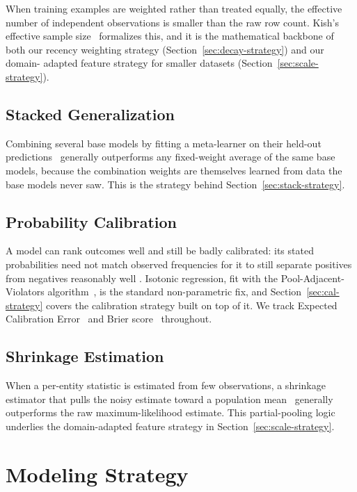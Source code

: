 \documentclass[conference]{IEEEtran}
\begin{document}
When training examples are weighted rather than treated equally, the
effective number of independent observations is smaller than the raw
row count. Kish's effective sample size~\cite{kish1965} formalizes
this, and it is the mathematical backbone of both our recency
weighting strategy (Section~\ref{sec:decay-strategy}) and our domain-
adapted feature strategy for smaller datasets
(Section~\ref{sec:scale-strategy}).

\subsection{Stacked Generalization}

Combining several base models by fitting a meta-learner on their
held-out predictions~\cite{wolpert1992} generally outperforms any
fixed-weight average of the same base models, because the combination
weights are themselves learned from data the base models never saw.
This is the strategy behind Section~\ref{sec:stack-strategy}.

\subsection{Probability Calibration}

A model can rank outcomes well and still be badly calibrated: its
stated probabilities need not match observed frequencies for it to
still separate positives from negatives reasonably well
\cite{niculescu2005}. Isotonic regression, fit with the
Pool-Adjacent-Violators algorithm~\cite{zadrozny2002}, is the standard
non-parametric fix, and Section~\ref{sec:cal-strategy} covers the
calibration strategy built on top of it. We track Expected Calibration
Error~\cite{guo2017} and Brier score~\cite{brier1950} throughout.

\subsection{Shrinkage Estimation}

When a per-entity statistic is estimated from few observations, a
shrinkage estimator that pulls the noisy estimate toward a population
mean~\cite{efronmorris1975} generally outperforms the raw
maximum-likelihood estimate. This partial-pooling
logic~\cite{gelmanhill2007} underlies the domain-adapted feature
strategy in Section~\ref{sec:scale-strategy}.

\section{Modeling Strategy}
\label{sec:strategy}
\end{document}
